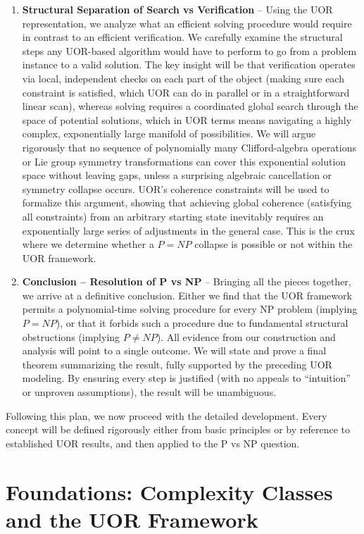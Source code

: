 \documentclass[11pt]{article}
\begin{document}
\begin{enumerate}[label=\arabic*.]
    \item \textbf{Structural Separation of Search vs Verification} -- Using the UOR representation, we analyze what an efficient solving procedure would require in contrast to an efficient verification. We carefully examine the structural steps any UOR-based algorithm would have to perform to go from a problem instance to a valid solution. The key insight will be that verification operates via local, independent checks on each part of the object (making sure each constraint is satisfied, which UOR can do in parallel or in a straightforward linear scan), whereas solving requires a coordinated global search through the space of potential solutions, which in UOR terms means navigating a highly complex, exponentially large manifold of possibilities. We will argue rigorously that no sequence of polynomially many Clifford-algebra operations or Lie group symmetry transformations can cover this exponential solution space without leaving gaps, unless a surprising algebraic cancellation or symmetry collapse occurs. UOR’s coherence constraints will be used to formalize this argument, showing that achieving global coherence (satisfying all constraints) from an arbitrary starting state inevitably requires an exponentially large series of adjustments in the general case. This is the crux where we determine whether a \(P = NP\) collapse is possible or not within the UOR framework.
    \item \textbf{Conclusion -- Resolution of P vs NP} -- Bringing all the pieces together, we arrive at a definitive conclusion. Either we find that the UOR framework permits a polynomial-time solving procedure for every NP problem (implying \(P = NP\)), or that it forbids such a procedure due to fundamental structural obstructions (implying \(P \neq NP\)). All evidence from our construction and analysis will point to a single outcome. We will state and prove a final theorem summarizing the result, fully supported by the preceding UOR modeling. By ensuring every step is justified (with no appeals to “intuition” or unproven assumptions), the result will be unambiguous.
\end{enumerate}

Following this plan, we now proceed with the detailed development. Every concept will be defined rigorously either from basic principles or by reference to established UOR results, and then applied to the P vs NP question.

\section{Foundations: Complexity Classes and the UOR Framework}
\end{document}
